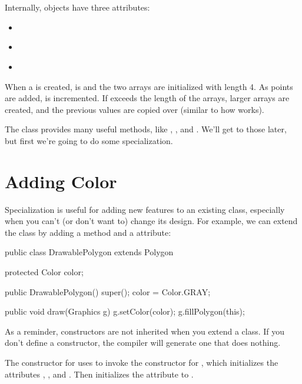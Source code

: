 Internally,  objects have three attributes:

\begin{itemize}

\item {} {\tt ~~~} 

\item {} {\tt ~} 

\item {} {\tt ~} 

\end{itemize}

When a  is created,  is  and the two arrays are initialized with length 4.
As points are added,  is incremented.
If  exceeds the length of the arrays, larger arrays are created, and the previous values are copied over (similar to how  works).

The  class provides many useful methods, like , , and .
We'll get to those later, but first we're going to do some specialization.


\section{Adding Color}

Specialization is useful for adding new features to an existing class, especially when you can't (or don't want to) change its design.
For example, we can extend the  class by adding a  method and a  attribute:

\begin{code}
public class DrawablePolygon extends Polygon {
    protected Color color;

    public DrawablePolygon() {
        super();
        color = Color.GRAY;
    }

    public void draw(Graphics g) {
        g.setColor(color);
        g.fillPolygon(this);
    }
}
\end{code}

As a reminder, constructors are not inherited when you extend a class.
If you don't define a constructor, the compiler will generate one that does nothing.

The constructor for  uses  to invoke the constructor for , which initializes the attributes , , and .
Then  initializes the  attribute to .

